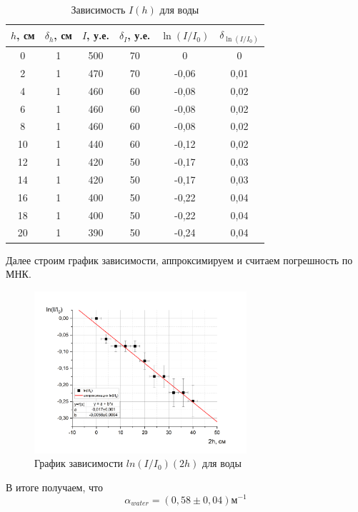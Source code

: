 \documentclass[a4paper, 12pt]{article}%
\begin{document}
\begin{table}[h]
\begin{center}
\begin{tabular}{|c|c|c|c|c|c|}
\hline
$h$, см & $\delta_h$, см & $I$, у.е. & $\delta_I$, у.е. & $\ln(I/I_0)$ & $\delta_{\ln(I/I_0)}$ \\ \hline
0       & 1              & 500       & 70               & 0            & 0                     \\ \hline
2       & 1              & 470       & 70               & -0,06        & 0,01                  \\ \hline
4       & 1              & 460       & 60               & -0,08        & 0,02                  \\ \hline
6       & 1              & 460       & 60               & -0,08        & 0,02                  \\ \hline
8       & 1              & 460       & 60               & -0,08        & 0,02                  \\ \hline
10      & 1              & 440       & 60               & -0,12        & 0,02                  \\ \hline
12      & 1              & 420       & 50               & -0,17        & 0,03                  \\ \hline
14      & 1              & 420       & 50               & -0,17        & 0,03                  \\ \hline
16      & 1              & 400       & 50               & -0,22        & 0,04                  \\ \hline
18      & 1              & 400       & 50               & -0,22        & 0,04                  \\ \hline
20      & 1              & 390       & 50               & -0,24        & 0,04                  \\ \hline
\end{tabular}
\caption{Зависимость $I(h)$ для воды}
\end{center}
\end{table}
Далее строим график зависимости, аппроксимируем и считаем погрешность по МНК. 

\begin{figure}[h]
\begin{center}
\includegraphics[width = 0.7\textwidth]{1.jpg}
\caption{График зависимости $ln(I/I_0) (2h)$ для воды }
\end{center}
\end{figure}
В итоге получаем, что 
\[\alpha_{water} = (0,58 \pm 0,04) \text{м}^{-1}\]
\newpage
\end{document}
